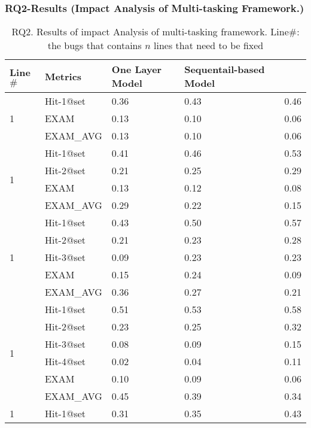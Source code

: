 \subsubsection{RQ2-Results ({\bf Impact Analysis of Multi-tasking Framework.})}

\begin{table}[b]
	\caption{RQ2. Results of impact Analysis of multi-tasking framework. Line$\#$: the bugs that contains $n$ lines that need to be fixed}
	{\small
		\begin{center}
			\renewcommand{\arraystretch}{1}
			\begin{tabular}{p{0.5cm}<{\centering}|p{1.5cm}<{\centering}|p{1.5cm}<{\centering}|p{1.5cm}<{\centering}|p{1.2cm}<{\centering}}
				\hline
				Line$\#$ & Metrics & One Layer Model & Sequentail-based Model & \tool \\
				\hline
				\multirow{3}{*}{1}  & Hit-1@set     & 0.36 & 0.43 & 0.46  \\
									& EXAM          & 0.13 & 0.10 & 0.06  \\
									& EXAM\_AVG     & 0.13 & 0.10 & 0.06  \\
				\hline
				\multirow{4}{*}{1}  & Hit-1@set     & 0.41 & 0.46 & 0.53  \\
									& Hit-2@set     & 0.21 & 0.25 & 0.29  \\
									& EXAM          & 0.13 & 0.12 & 0.08  \\
									& EXAM\_AVG     & 0.29 & 0.22 & 0.15 \\
				\hline
				\multirow{5}{*}{1}  & Hit-1@set     & 0.43 & 0.50 & 0.57 \\
									& Hit-2@set     & 0.21 & 0.23 & 0.28 \\
									& Hit-3@set     & 0.09 & 0.23 & 0.23 \\
									& EXAM          & 0.15 & 0.24 & 0.09 \\
									& EXAM\_AVG     & 0.36 & 0.27 & 0.21 \\
				\hline
				\multirow{6}{*}{1}  & Hit-1@set     & 0.51 & 0.53 & 0.58 \\
									& Hit-2@set     & 0.23 & 0.25 & 0.32 \\
									& Hit-3@set     & 0.08 & 0.09 & 0.15 \\
									& Hit-4@set     & 0.02 & 0.04 & 0.11 \\
									& EXAM          & 0.10 & 0.09 & 0.06 \\
									& EXAM\_AVG     & 0.45 & 0.39 & 0.34 \\
				\hline
				\multirow{7}{*}{1}  & Hit-1@set     & 0.31 & 0.35 & 0.43 \\

\end{tabular}
\end{center}}
\end{table}
